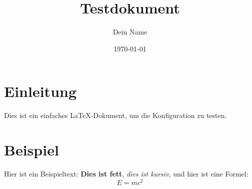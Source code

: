 \documentclass{article}
\title{Testdokument}
\author{Dein Name}
\date{\today}
\begin{document}
\maketitle

\section{Einleitung}
Dies ist ein einfaches LaTeX-Dokument, um die Konfiguration zu testen.

\section{Beispiel}
Hier ist ein Beispieltext: \textbf{Dies ist fett}, \textit{dies ist kursiv}, und hier ist eine Formel:
\[
E = mc^2
\]
\end{document}
